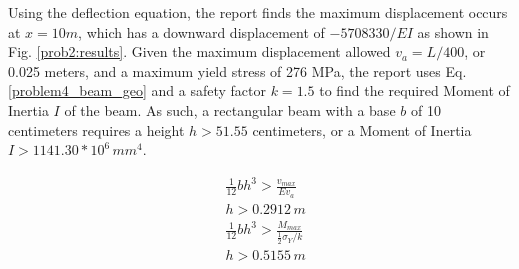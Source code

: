 \documentclass[a4paper]{article}
\begin{document}
Using the deflection equation, the report finds the maximum displacement occurs at $x = 10 m$, which has a downward displacement of $-5708330/EI$ as shown in Fig. \ref{prob2:results}. Given the maximum displacement allowed $v_a = L/400$, or 0.025 meters, and a maximum yield stress of 276 MPa, the report uses Eq. \ref{problem4_beam_geo} and a safety factor $k=1.5$ to find the required Moment of Inertia $I$ of the beam. As such, a rectangular beam with a base $b$ of 10 centimeters requires a height $h>51.55$ centimeters, or a Moment of Inertia $I > 1141.30 * 10^6\,{mm}^4$.


\begin{equation}
\begin{split}
& \frac{1}{12}bh^3 > \frac{v_{max}}{Ev_a} \\
& h > 0.2912\,m \\
& \frac{1}{12}bh^3 > \frac{M_{max}}{\frac{1}{2}\sigma_Y/ k}\\
& h > 0.5155\,m \\
\end{split}
\label{problem4_beam_geo}
\end{equation}
\end{document}
